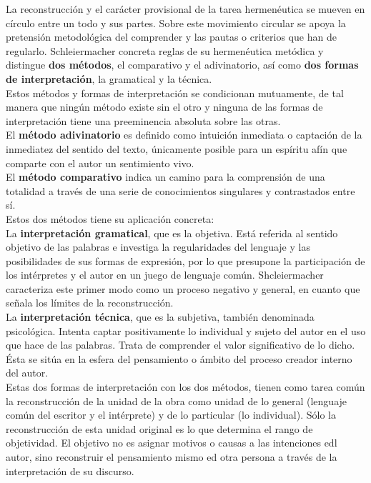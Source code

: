 \documentclass[a4paper, 11pt, twocolumn, spanish]{article}
\begin{document}
La reconstrucción y el carácter provisional de la tarea hermenéutica
se mueven en círculo entre un todo y sus partes. Sobre este movimiento
circular se apoya la pretensión metodológica del comprender y las
pautas o criterios que han de regularlo. Schleiermacher concreta
reglas de su hermenéutica metódica y distingue \textbf{dos métodos}, el
comparativo y el adivinatorio, así como \textbf{dos formas de
interpretación}, la gramatical y la técnica.\\[0pt]

Estos métodos y formas de interpretación se condicionan mutuamente,
de tal manera que ningún método existe sin el otro y ninguna de las
formas de interpretación tiene una preeminencia absoluta sobre las
otras.\\[0pt]
El \textbf{método adivinatorio} es definido como intuición inmediata o
captación de la inmediatez del sentido del texto, únicamente posible
para un espíritu afín que comparte con el autor un sentimiento vivo.\\[0pt]
El \textbf{método comparativo} indica un camino para la comprensión de una
totalidad a través de una serie de conocimientos singulares y
contrastados entre sí.\\[0pt]

Estos dos métodos tiene su aplicación concreta:\\[0pt]
La \textbf{interpretación gramatical}, que es la objetiva. Está referida al
sentido objetivo de las palabras e investiga la regularidades del
lenguaje y las posibilidades de sus formas de expresión, por lo que
presupone la participación de los intérpretes y el autor en un juego
de lenguaje común. Shcleiermacher caracteriza este primer modo como un
proceso negativo y general, en cuanto que señala los límites de la
reconstrucción.\\[0pt]
La \textbf{interpretación técnica}, que es la subjetiva, también denominada
psicológica. Intenta captar positivamente lo individual y sujeto del
autor en el uso que hace de las palabras. Trata de comprender el valor
significativo de lo dicho. Ésta se sitúa en la esfera del pensamiento
o ámbito del proceso creador interno del autor.\\[0pt]

Estas dos formas de interpretación con los dos métodos, tienen como
tarea común la reconstrucción de la unidad de la obra como unidad de
lo general (lenguaje común del escritor y el intérprete) y de lo
particular (lo individual). Sólo la reconstrucción de esta unidad
original es lo que determina el rango de objetividad. El objetivo no
es asignar motivos o causas a las intenciones edl autor, sino
reconstruir el pensamiento mismo ed otra persona a través de la
interpretación de su discurso.
\end{document}
